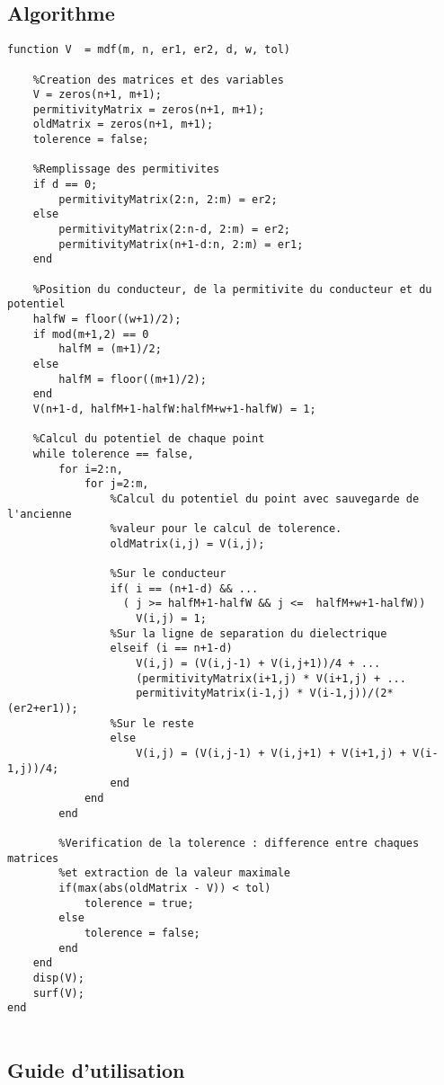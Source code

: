 \subsection{Algorithme}
\begin{lstlisting}
function V  = mdf(m, n, er1, er2, d, w, tol)
    
    %Creation des matrices et des variables
    V = zeros(n+1, m+1);
    permitivityMatrix = zeros(n+1, m+1);
    oldMatrix = zeros(n+1, m+1);
    tolerence = false;
    
    %Remplissage des permitivites
    if d == 0; 
        permitivityMatrix(2:n, 2:m) = er2;
    else
        permitivityMatrix(2:n-d, 2:m) = er2;
        permitivityMatrix(n+1-d:n, 2:m) = er1;
    end
    
    %Position du conducteur, de la permitivite du conducteur et du potentiel
    halfW = floor((w+1)/2);
    if mod(m+1,2) == 0
        halfM = (m+1)/2;
    else
        halfM = floor((m+1)/2);
    end    
    V(n+1-d, halfM+1-halfW:halfM+w+1-halfW) = 1;
    
    %Calcul du potentiel de chaque point
    while tolerence == false,
        for i=2:n,
            for j=2:m,
                %Calcul du potentiel du point avec sauvegarde de l'ancienne
                %valeur pour le calcul de tolerence.
                oldMatrix(i,j) = V(i,j);
                
                %Sur le conducteur
                if( i == (n+1-d) && ...
                  ( j >= halfM+1-halfW && j <=  halfM+w+1-halfW))
                    V(i,j) = 1;
                %Sur la ligne de separation du dielectrique
                elseif (i == n+1-d)
                    V(i,j) = (V(i,j-1) + V(i,j+1))/4 + ...
                    (permitivityMatrix(i+1,j) * V(i+1,j) + ...
                    permitivityMatrix(i-1,j) * V(i-1,j))/(2*(er2+er1));
                %Sur le reste
                else
                    V(i,j) = (V(i,j-1) + V(i,j+1) + V(i+1,j) + V(i-1,j))/4;
                end              
            end
        end
        
        %Verification de la tolerence : difference entre chaques matrices
        %et extraction de la valeur maximale
        if(max(abs(oldMatrix - V)) < tol)
            tolerence = true;
        else
            tolerence = false;
        end
    end
    disp(V);
    surf(V);
end


\end{lstlisting}

\subsection{Guide d'utilisation}

